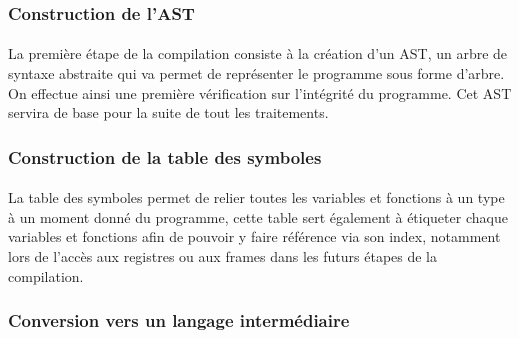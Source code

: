 \documentclass[a4paper]{article}
\begin{document}
\subsubsection{Construction de l’AST}
\paragraph{}
La première étape de la compilation consiste à la création d’un AST, un arbre de syntaxe abstraite qui va permet de représenter le programme sous forme d’arbre. On effectue ainsi une première vérification sur l’intégrité du programme. Cet AST servira de base pour la suite de tout les traitements.

\subsubsection{Construction de la table des symboles}
\paragraph{}
La table des symboles permet de relier toutes les variables et fonctions à un type à un moment donné du programme, cette table sert également à étiqueter chaque variables et fonctions afin de pouvoir y faire référence via son index, notamment lors de l’accès aux registres ou aux frames dans les futurs étapes de la compilation. 

\subsubsection{Conversion vers un langage intermédiaire}
\end{document}
